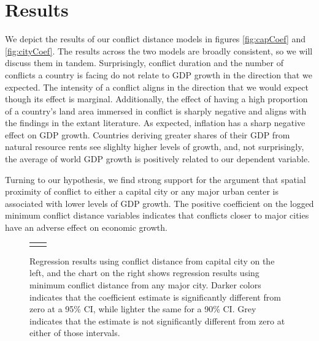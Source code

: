 \section{Results}
\label{findings} 

We depict the results of our conflict distance models in figures \ref{fig:capCoef} and \ref{fig:cityCoef}. The results across the two models are broadly consistent, so we will discuss them in tandem. Surprisingly, conflict duration and the number of conflicts a country is facing do not relate to GDP growth in the direction that we expected. The intensity of a conflict aligns in the direction that we would expect though its effect is marginal. Additionally, the effect of having a high proportion of a country's land area immersed in conflict is sharply negative and aligns with the findings in the extant literature. As expected, inflation has a sharp negative effect on GDP growth. Countries deriving greater shares of their GDP from natural resource rents see slighlty higher levels of growth, and, not surprisingly, the average of world GDP growth is positively related to our dependent variable.

Turning to our hypothesis, we find strong support for the argument that spatial proximity of conflict to either a capital city or any major urban center is associated with lower levels of GDP growth. The positive coefficient on the logged minimum conflict distance variables indicates that conflicts closer to major cities have an adverse effect on economic growth. 

\begin{figure}
	\centering
	\begin{tabular}{cc}
		\subfloat[SubFigure 1][Capital City]{
			\resizebox{.45\textwidth}{!}{}
		\label{fig:capCoef}} &
		\subfloat[SubFigure 2][Any Major City]{
			\resizebox{.45\textwidth}{!}{}
		\label{fig:cityCoef}}
	\end{tabular}
	\caption{Regression results using conflict distance from capital city on the left, and the chart on the right shows regression results using minimum conflict distance from any major city. Darker colors indicates that the coefficient estimate is significantly different from zero at a 95\% CI, while lighter the same for a 90\% CI. Grey indicates that the estimate is not significantly different from zero at either of those intervals.}
	\label{fig:coefplot}
\end{figure}

